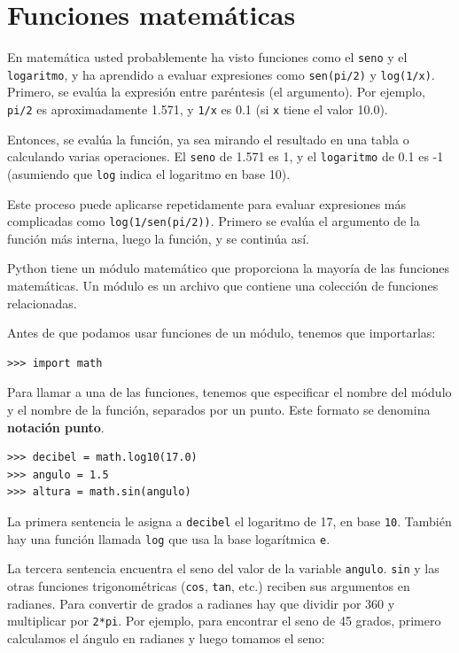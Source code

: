 \section{Funciones matemáticas}

 

En matemática usted probablemente ha visto funciones como el \texttt{seno}
y el \texttt{logaritmo}, y ha aprendido a evaluar expresiones como
\texttt{sen(pi/2)} y \texttt{log(1/x)}. Primero, se evalúa la expresión
entre paréntesis (el argumento). Por ejemplo, \texttt{pi/2} es aproximadamente
1.571, y \texttt{1/x} es 0.1 (si \texttt{x} tiene el valor 10.0).

Entonces, se evalúa la función, ya sea mirando el resultado en una
tabla o calculando varias operaciones. El \texttt{seno} de 1.571 es
1, y el \texttt{logaritmo} de 0.1 es -1 (asumiendo que \texttt{log}
indica el logaritmo en base 10).

Este proceso puede aplicarse repetidamente para evaluar expresiones
más complicadas como \texttt{log(1/sen(pi/2))}. Primero se evalúa
el argumento de la función más interna, luego la función, y se continúa
así.

Python tiene un módulo matemático que proporciona la mayoría de las
funciones matemáticas. Un módulo es un archivo que contiene una colección
de funciones relacionadas.


Antes de que podamos usar funciones de un módulo, tenemos que importarlas:

\begin{lstlisting}
>>> import math
\end{lstlisting}
 Para llamar a una de las funciones, tenemos que especificar el nombre
del módulo y el nombre de la función, separados por un punto. Este
formato se denomina \textbf{notación punto}.


\begin{lstlisting}
>>> decibel = math.log10(17.0)
>>> angulo = 1.5
>>> altura = math.sin(angulo)
\end{lstlisting}
 La primera sentencia le asigna a \texttt{decibel} el logaritmo de
17, en base \texttt{10}. También hay una función llamada \texttt{log}
que usa la base logarítmica \texttt{e}.

La tercera sentencia encuentra el seno del valor de la variable \texttt{angulo}.
\texttt{sin} y las otras funciones trigonométricas (\texttt{cos},
\texttt{tan}, etc.) reciben sus argumentos en radianes. Para convertir
de grados a radianes hay que dividir por 360 y multiplicar por \texttt{2{*}pi}.
Por ejemplo, para encontrar el seno de 45 grados, primero calculamos
el ángulo en radianes y luego tomamos el seno:

